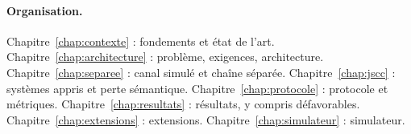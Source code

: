 \paragraph{Organisation.} Chapitre~\ref{chap:contexte} : fondements et état de l'art.
Chapitre~\ref{chap:architecture} : problème, exigences, architecture. Chapitre~\ref{chap:separee} : canal
simulé et chaîne séparée. Chapitre~\ref{chap:jscc} : systèmes appris et perte sémantique.
Chapitre~\ref{chap:protocole} : protocole et métriques. Chapitre~\ref{chap:resultats} : résultats, y compris
défavorables. Chapitre~\ref{chap:extensions} : extensions. Chapitre~\ref{chap:simulateur} : simulateur.
